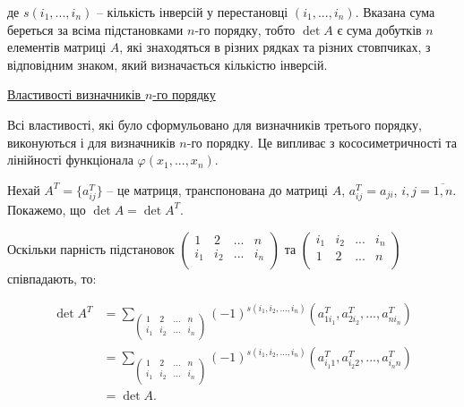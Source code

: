 де $s(i_1, ..., i_n)$ -- кількість інверсій у перестановці $(i_1, ..., i_n)$. Вказана сума береться
за всіма підстановками $n$-го порядку, тобто $\det A$ є сума добутків $n$ елементів
матриці $A$, які знаходяться в різних рядках та різних стовпчиках, з відповідним
знаком, який визначається кількістю інверсій.

\underline{Властивості визначників $n$-го порядку}

Всі властивості, які було сформульовано для визначників третього порядку,
виконуються і для визначників $n$-го порядку. Це випливає з кососиметричності та
лінійності функціонала $\varphi(x_1, ..., x_n)$.

Нехай $A^T = \{a_{ij}^T\}$ -- це матриця, транспонована до матриці $A$, $a_{ij}^T = a_{ji}$,
$i, j = \overline{1,n}$. Покажемо, що $\det A = \det A^T$.

Оскільки парність підстановок $\begin{pmatrix}
	1 & 2 & ... & n \\
	i_1 & i_2 & ... & i_n \\
\end{pmatrix}$ та $\begin{pmatrix}
	i_1 & i_2 & ... & i_n \\	
	1 & 2 & ... & n \\
\end{pmatrix}$ співпадають, то:

\begin{equation*}
    \begin{split}
        \det A^T
        & = \sum\limits_{ \begin{pmatrix}
        				 	1 & 2 & ... & n \\
        			 		i_1 & i_2 & ... & i_n \\
        				\end{pmatrix} }
        	(-1)^{s(i_1, i_2, ..., i_n)} (a_{1 i_1}^T, a_{2 i_2}^T, ..., a_{n i_n}^T)\\
        & = \sum\limits_{ \begin{pmatrix}
        				 	1 & 2 & ... & n \\
        			 		i_1 & i_2 & ... & i_n \\
        				\end{pmatrix} }
        	(-1)^{s(i_1, i_2, ..., i_n)} (a_{i_1 1}^T, a_{i_2 2}^T, ..., a_{i_n n}^T)\\
        & = \det A.
    \end{split}
\end{equation*}



